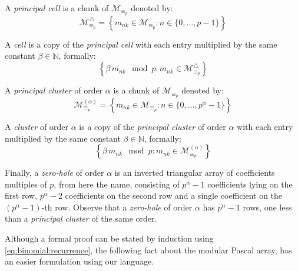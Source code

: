 A \emph{principal cell} is a chunk of $\mathcal{M}_{\equiv_{p}}$ denoted by:
\begin{displaymath}
    \mathcal{M}_{\equiv_{p}}^{\bigtriangleup} = 
        \left\lbrace m_{nk}\in \mathcal{M}_{\equiv_{p}}: n\in\lbrace 0,\ldots,p-1\rbrace\right\rbrace
\end{displaymath}

A \emph{cell} is a copy of the \emph{principal cell} with each entry multiplied 
by the same constant $\beta\in\mathbb{N}$, formally:
\begin{displaymath}
    \left\lbrace \beta\,m_{nk}\mod p:m_{nk}\in \mathcal{M}_{\equiv_{p}}^{\bigtriangleup}\right\rbrace
\end{displaymath}

A \emph{principal cluster} of order $\alpha$ is a chunk of $\mathcal{M}_{\equiv_{p}}$ denoted by:
\begin{displaymath}
    \mathcal{M}_{\equiv_{p}}^{(\alpha)} = 
        \left\lbrace m_{nk}\in \mathcal{M}_{\equiv_{p}}: n\in\lbrace 0,\ldots,p^{\alpha}-1\rbrace\right\rbrace
\end{displaymath}

A \emph{cluster} of order $\alpha$ is a copy of the \emph{principal cluster}
of order $\alpha$ with each entry multiplied 
by the same constant $\beta\in\mathbb{N}$, formally:
\begin{displaymath}
    \left\lbrace \beta\,m_{nk}\mod p:m_{nk}\in \mathcal{M}_{\equiv_{p}}^{(\alpha)}\right\rbrace
\end{displaymath}

Finally, a \emph{zero-hole} of order $\alpha$ is an inverted triangular array of
coefficients multiples of $p$, from here the name, consisting of $p^{\alpha}-1$
coefficients lying on the first row, $p^{\alpha}-2$ coefficients on the second row
and a single coefficient on the $(p^{\alpha}-1)$-th row. 
Observe that a \emph{zero-hole} of order $\alpha$ has $p^{\alpha}-1$ rows, one less
than a \emph{principal cluster} of the same order.

Although a formal proof can be stated by induction using \autoref{eq:binomial:recurrence},
the following fact about the modular Pascal array, has an easier formulation
using our language.

